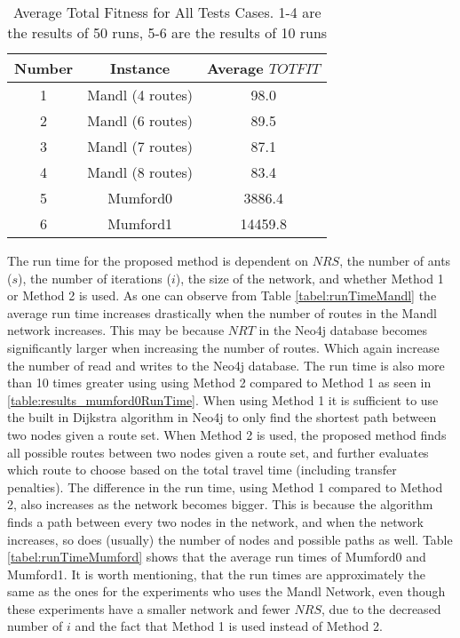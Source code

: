 \begin{table}[H]
    \centering
    \hspace*{-1.0cm}
    \begin{tabular}{|c|c|c|}
        \hline
        \textbf{Number} & \textbf{Instance} & \textbf{Average $TOTFIT$}\\
        \hline
        1 & Mandl (4 routes) & 98.0\\
        \hline
        2 & Mandl (6 routes) & 89.5\\
        \hline
        3 & Mandl (7 routes) & 87.1\\
        \hline
        4 & Mandl (8 routes) & 83.4\\
        \hline
        5 & Mumford0 & 3886.4\\
        \hline
        6 & Mumford1 & 14459.8\\
        \hline
    \end{tabular}
    \caption{Average Total Fitness for All Tests Cases. 1-4 are the results of 50 runs, 5-6 are the results of 10 runs}
    \label{tabel:averageTotfitAllTestCases}
\end{table}
 
The run time for the proposed method is dependent on $NRS$, the number of ants ($s$), the number of iterations ($i$), the size of the network, and whether Method 1 or Method 2 is used. As one can observe from Table \vref{tabel:runTimeMandl} the average run time increases drastically when the number of routes in the Mandl network increases. This may be because $NRT$ in the Neo4j database becomes significantly larger when increasing the number of routes. Which again increase the number of read and writes to the Neo4j database. The run time is also more than 10 times greater using using Method 2 compared to Method 1 as seen in \vref{table:results_mumford0RunTime}. When using Method 1 it is sufficient to use the built in Dijkstra algorithm in Neo4j to only find the shortest path between two nodes given a route set. When Method 2 is used, the proposed method finds all possible routes between two nodes given a route set, and further evaluates which route to choose based on the total travel time (including transfer penalties). The difference in the run time, using Method 1 compared to Method 2, also increases as the network becomes bigger. This is because the algorithm finds a path between every two nodes in the network, and when the network increases, so does (usually) the number of nodes and possible paths as well. Table \vref{tabel:runTimeMumford} shows that the average run times of Mumford0 and Mumford1. It is worth mentioning, that the run times are approximately the same as the ones for the experiments who uses the Mandl Network, even though these experiments have a smaller network and fewer $NRS$, due to the decreased number of $i$ and the fact that Method 1 is used instead of Method 2. 

